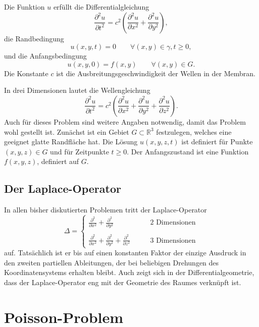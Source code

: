Die Funktion $ u $
erfüllt die Differentialgleichung
\[
\frac{\partial^2 u }{\partial t^2}
=c^2\left(\frac{\partial^2 u }{\partial x^2}+\frac{\partial^2 u }{\partial y^2}\right),
\]
die Randbedingung
\[
 u (x,y,t)=0\qquad \forall (x,y)\in\gamma,t\ge 0,
\]
und die Anfangsbedingung
\[
 u (x,y,0)=f(x,y)\qquad \forall (x,y)\in G.
\]
Die Konstante $c$ ist die Ausbreitungsgeschwindigkeit der Wellen in der Membran.

In drei Dimensionen lautet
die Wellengleichung 
\[
\frac{\partial^2 u }{\partial t^2}
=c^2\left(\frac{\partial^2 u }{\partial x^2}
+\frac{\partial^2 u }{\partial y^2}
+\frac{\partial^2 u }{\partial z^2}
\right).
\]
Auch für dieses Problem sind weitere Angaben notwendig, damit das Problem
wohl gestellt ist.
Zunächst ist ein Gebiet $G\subset \mathbb R^3$ festzulegen, welches
eine geeignet glatte Randfläche hat.
Die Lösung $ u (x,y,z,t)$ ist definiert für Punkte $(x,y,z)\in G$
und für Zeitpunkte $t\ge 0$.
Der Anfangszustand ist eine Funktion $f(x,y,z)$,
definiert auf $G$.

\subsection{Der Laplace-Operator\label{beispiele:laplaceoperator}}
In allen bisher diskutierten Problemen tritt der Laplace-Operator
\[
\Delta
=
\begin{cases}
\displaystyle
\frac{\partial^2}{\partial x^2}
+\frac{\partial^2}{\partial y^2}&\qquad\text{2 Dimensionen}\\
\\
\displaystyle
\frac{\partial^2}{\partial x^2}
+\frac{\partial^2}{\partial y^2}
+\frac{\partial^2}{\partial z^2}&\qquad\text{3 Dimensionen}
\end{cases}
\]
auf. Tatsächlich ist er bis auf einen konstanten Faktor der einzige Ausdruck
in den zweiten partiellen Ableitungen, der bei beliebigen Drehungen des
Koordinatensystems erhalten bleibt.
Auch zeigt sich in der Differentialgeometrie, dass der Laplace-Operator
eng mit der Geometrie des Raumes verknüpft ist.

\section{Poisson-Problem}

